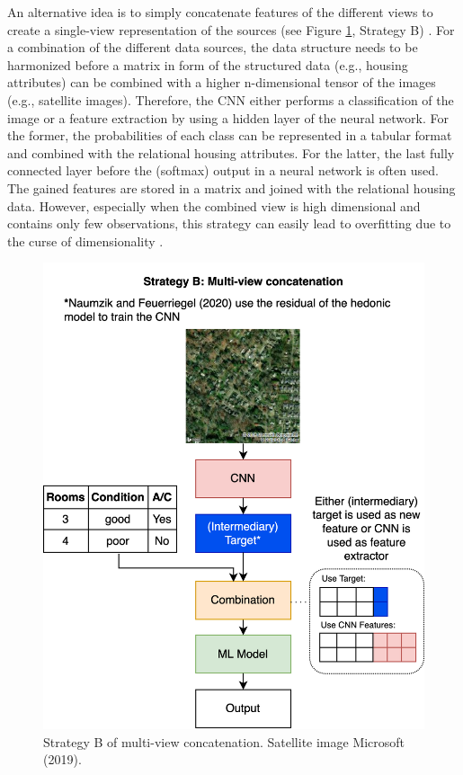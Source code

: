 \documentclass[letterpaper]{article}
\begin{document}
An alternative idea is to simply concatenate features of the different views to create a single-view representation of the sources (see Figure \ref{strategyB}, Strategy B) \cite{zhao2017multi}. For a combination of the different data sources, the data structure needs to be harmonized before a matrix in form of the structured data (e.g., housing attributes) can be combined with a higher n-dimensional tensor of the images (e.g., satellite images). Therefore, the CNN either performs a classification of the image or a feature extraction by using a hidden layer of the neural network. For the former, the probabilities of each class can be represented in a tabular format and combined with the relational housing attributes. For the latter, the last fully connected layer before the (softmax) output in a neural network is often used. The gained features are stored in a matrix and joined with the relational housing data. However, especially when the combined view is high dimensional and contains only few observations, this strategy can easily lead to overfitting due to the curse of dimensionality \cite{xu2013survey}.

\begin{figure}[t]
\centering
\includegraphics[width=0.9\columnwidth]{StrategyB.png} %
\caption{Strategy B of multi-view concatenation. Satellite image \textcopyright \space Microsoft (2019).}
\label{strategyB}
\end{figure}
\end{document}
